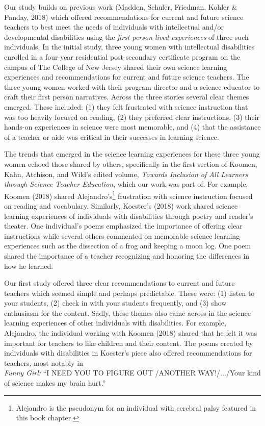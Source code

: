 \documentclass[11pt]{sig-alternate}
\begin{document}
\begin{large}
Our study builds on previous work (Madden, Schuler, Friedman, Kohler \& Panday, 2018) whi\-ch offered recommendations for current and future science teachers to best meet the needs of individuals with intellectual and/or developmental disabilities using the \textit{first person lived experiences} of three such individuals. In the initial study, three young women with intellectual disabilities enrolled in a four-year residential post-secondary certificate program on the campus of The College of New Jersey shared their own science learning experiences and recommendations for current and future science teachers. The three young women worked with their program director and a science educator to craft their first person narratives. Across the three stories several clear themes emerged. These included: (1) they felt frustrated with science instruction that was too heavily focused on reading, (2) they preferred clear instructions, (3) their hands-on experiences in science were most memorable, and (4) that the assistance of a teacher or aide was critical in their successes in learning science. 

The trends that emerged in the science learning experiences for these three young women echoed those shared by others, specifically in the first section of Koomen, Kahn, Atchison, and Wild’s edited volume, \textit{Towards Inclusion of All Learners through Science Teacher Education}, which our work was part of. For example, Koomen (2018) shared Alejandro’s\footnote{Alejandro is the pseudonym for an individual with cerebral palsy featured in this book chapter.} frustration with science instruction focused on reading and vocabulary. Similarly, Koester’s (2018) work shared science learning experiences of individuals with disabilities through poetry and reader’s theater. One individual’s poems emphasized the importance of offering clear instructions wh\-ile several others commented on memorable science learning experiences such as the dissection of a frog and keeping a moon log. One poem shared the importance of a teacher recognizing and honoring the differences in how he learned. 

Our first study offered three clear recommendations to current and future teachers which seemed simple and perhaps predictable. These were: (1) listen to your students, (2) check in with your students frequently, and (3) show enthusiasm for the content. Sadly, these themes also came across in the science learning experiences of other individuals with disabilities. For example, Alejandro, the individual working with Koomen (2018) shared that he felt it was important for teachers to like children and their content. The poems created by individuals with disabilities in Koester’s piece also offered recommendations for teachers, most notably in \\\textit{Funny Girl:} “I NEED YOU TO FIGURE OUT /ANOTHER WAY!/.../Your kind of science ma\-kes my brain hurt.” 


\end{large}
\end{document}
